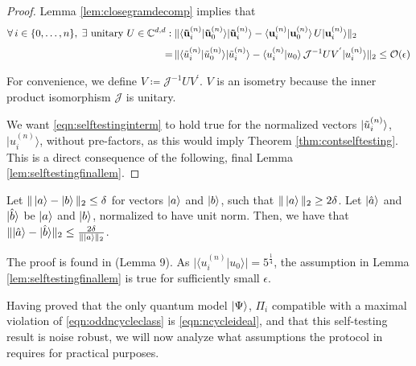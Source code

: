 \begin{proof}
Lemma \ref{lem:closegramdecomp} implies that 
\begin{align}
\label{eqn:selftestinginterm}
\begin{split}
    \forall\thinspace i\in\{0,\dots,n\},\; \exists \text{ unitary } U\in\mathbb{C}^{d,d}: \; & \| \langle \mathbf{\Tilde{u}}_i^{(n)} \vert \mathbf{\Tilde{u}}_0^{(n)} \rangle \vert \mathbf{\Tilde{u}}_i^{(n)} \rangle - \langle \mathbf{u}_i^{(n)} \vert \mathbf{u}_0^{(n)} \rangle \thinspace U\vert \mathbf{u}_i^{(n)}\rangle\|_2 \\[0.3em]
    = \thinspace & \| \langle \Tilde{u}_i^{(n)} \vert \Tilde{u}_0^{(n)} \rangle \vert \Tilde{u}_i^{(n)} \rangle - \langle u_i^{(n)} \vert u_0 \rangle \thinspace \mathcal{J}^{-1}UV^{'} \vert u_i^{(n)}\rangle\|_2 \leq \mathcal{O}(\epsilon)
\end{split}
\end{align}

For convenience, we define $V\coloneqq \mathcal{J}^{-1}UV^{'}$. $V$ is an isometry because the inner product isomorphism $\mathcal{J}$ is unitary. 

We want \ref{eqn:selftestinginterm} to hold true for the normalized vectors $\vert \Tilde{u}_i^{(n)} \rangle$, $\vert u_i^{(n)}\rangle$, without pre-factors, as this would imply Theorem \ref{thm:contselftesting}. This is a direct consequence of the following, final Lemma \ref{lem:selftestingfinallem}.
\end{proof}

\begin{lemma}
\label{lem:selftestingfinallem}
Let $\| \ket{a} - \ket{b} \|_2\leq\delta$ for vectors $\ket{a}$ and $\ket{b}$, such that $\|\ket{a}\|_2\geq2\delta$. Let $\vert \Hat{a} \rangle$ and $\vert \Hat{b} \rangle$ be $\ket{a}$ and $\ket{b}$, normalized to have unit norm. Then, we have that $\| \vert \Hat{a}\rangle-\vert \Hat{b} \rangle \|_2\leq \frac{2\delta}{\|\ket{a}\|_2}$.
\end{lemma}
The proof is found in \cite{Bharti2019} (Lemma 9). As $\vert \langle u_i^{(n)}\vert u_0 \rangle \vert =5^{\frac{1}{4}}$, the assumption in Lemma \ref{lem:selftestingfinallem} is true for sufficiently small $\epsilon$.

Having proved that the only quantum model $\ket{\Psi}$, $\Pi_i$ compatible with a maximal violation of \ref{eqn:oddncycleclass} is \ref{eqn:ncycleideal}, and that this self-testing result is noise robust, we will now analyze what assumptions the protocol in \cite{Bharti2019} requires for practical purposes.

